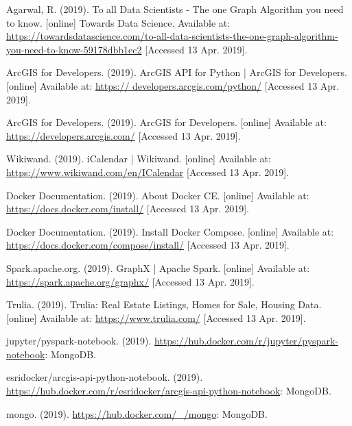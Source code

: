 \documentclass[11 pt]{article}
\theoremstyle{definition}
\theoremstyle{definition}
\begin{document}
\begin{thebibliography}{99}

Agarwal, R. (2019). To all Data Scientists - The one Graph Algorithm you need to know. [online] Towards Data Science. Available at: \url{https://towardsdatascience.com/to-all-data-scientists-the-one-graph-algorithm-you-need-to-know-59178dbb1ec2} [Accessed 13 Apr. 2019].

ArcGIS for Developers. (2019). ArcGIS API for Python | ArcGIS for Developers. [online] Available at: \url{https://
developers.arcgis.com/python/} [Accessed 13 Apr. 2019].

ArcGIS for Developers. (2019). ArcGIS for Developers. [online] Available at: \url{https://developers.arcgis.com/} [Accessed 13 Apr. 2019].

Wikiwand. (2019). iCalendar | Wikiwand. [online] Available at: \url{https://www.wikiwand.com/en/ICalendar} [Accessed 13 Apr. 2019].
  
Docker Documentation. (2019). About Docker CE. [online] Available at: \url{https://docs.docker.com/install/} [Accessed 13 Apr. 2019].

Docker Documentation. (2019). Install Docker Compose. [online] Available at: \url{https://docs.docker.com/compose/install/} [Accessed 13 Apr. 2019].
  
Spark.apache.org. (2019). GraphX | Apache Spark. [online] Available at: \url{https://spark.apache.org/graphx/} [Accessed 13 Apr. 2019].

Trulia. (2019). Trulia: Real Estate Listings, Homes for Sale, Housing Data. [online] Available at: \url{https://www.trulia.com/} [Accessed 13 Apr. 2019].


jupyter/pyspark-notebook. (2019). \url{https://hub.docker.com/r/jupyter/pyspark-notebook}: MongoDB.

esridocker/arcgis-api-python-notebook. (2019). \url{https://hub.docker.com/r/esridocker/arcgis-api-python-notebook}: MongoDB.

mongo. (2019). \url{https://hub.docker.com/_/mongo}: MongoDB.
\end{thebibliography}
\end{document}
